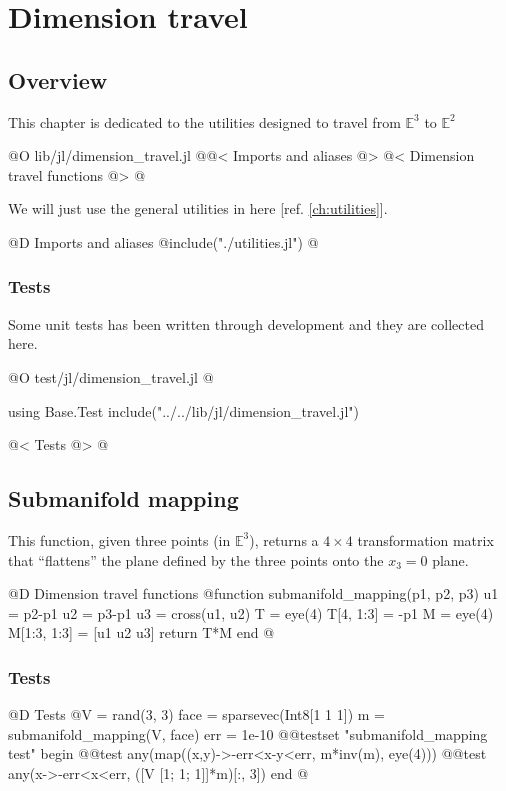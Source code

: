 
\chapter{Dimension travel}
\label{ch:dimension_travel}

\section{Overview}

This chapter is dedicated to
the utilities designed to travel
from $\mathbb{E}^3$ to $\mathbb{E}^2$

@O lib/jl/dimension_travel.jl
@{@< Imports and aliases @>
@< Dimension travel functions @>
@}

We will just use the general utilities
in here [ref. \ref{ch:utilities}].

@D Imports and aliases
@{include("./utilities.jl")
@}
\subsection{Tests}

Some unit tests has been written through development and
they are collected here.

@O test/jl/dimension_travel.jl
@{using Base.Test
include("../../lib/jl/dimension_travel.jl")

@< Tests @>
@}


\section{Submanifold mapping}
\label{sec:submanifold_mapping}

This function, given three points (in $\mathbb{E}^3$), 
returns a $4\times4$ transformation matrix that ``flattens''
the plane defined by the three points onto the $x_3=0$ plane.

@D Dimension travel functions
@{function submanifold_mapping(p1, p2, p3)
    u1 = p2-p1
    u2 = p3-p1
    u3 = cross(u1, u2)
    T = eye(4)
    T[4, 1:3] = -p1
    M = eye(4)
    M[1:3, 1:3] = [u1 u2 u3]
    return T*M
end
@}
\subsection{Tests}

@D Tests
@{V = rand(3, 3)
face = sparsevec(Int8[1 1 1])
m = submanifold_mapping(V, face)
err = 1e-10 
@@testset "submanifold_mapping test" begin
    @@test any(map((x,y)->-err<x-y<err, m*inv(m), eye(4)))
    @@test any(x->-err<x<err, ([V [1; 1; 1]]*m)[:, 3])
end
@}





